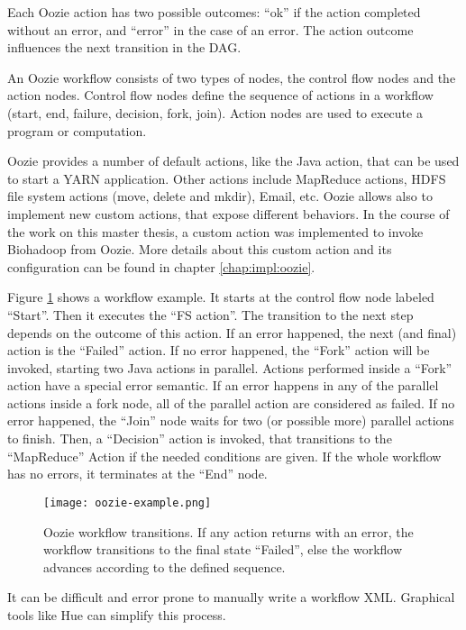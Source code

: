 Each Oozie action has two possible outcomes: ``ok'' if the action completed without an error, and ``error'' in the case of an error. The action outcome influences the next transition in the DAG. 

An Oozie workflow consists of two types of nodes, the control flow nodes and the action nodes. Control flow nodes define the sequence of actions in a workflow (start, end, failure, decision, fork, join). Action nodes are used to execute a program or computation.

Oozie provides a number of default actions, like the Java action, that can be used to start a YARN application. Other actions include MapReduce actions, HDFS file system actions (move, delete and mkdir), Email, etc. Oozie allows also to implement new custom actions, that expose different behaviors. In the course of the work on this master thesis, a custom action was implemented to invoke Biohadoop from Oozie. More details about this custom action and its configuration can be found in chapter \ref{chap:impl:oozie}.

Figure \ref{fig:oozie-example} shows a workflow example. It starts at the control flow node labeled ``Start''. Then it executes the ``FS action''. The transition to the next step depends on the outcome of this action. If an error happened, the next (and final) action is the ``Failed'' action. If no error happened, the ``Fork'' action will be invoked, starting two Java actions in parallel. Actions performed inside a ``Fork'' action have a special error semantic. If an error happens in any of the parallel actions inside a fork node, all of the parallel action are considered as failed. If no error happened, the ``Join'' node waits for two (or possible more) parallel actions to finish. Then, a ``Decision'' action is invoked, that transitions to the ``MapReduce'' Action if the needed conditions are given. If the whole workflow has no errors, it terminates at the ``End'' node.

\begin{figure}[ht!]
  \centering
  \texttt{[image: oozie-example.png]}
  \caption{Oozie workflow transitions. If any action returns with an error, the workflow transitions to the final state ``Failed'', else the workflow advances according to the defined sequence.}
  \label{fig:oozie-example}
\end{figure}

It can be difficult and error prone to manually write a workflow XML. Graphical tools like Hue \cite{oozie-hue} can simplify this process.